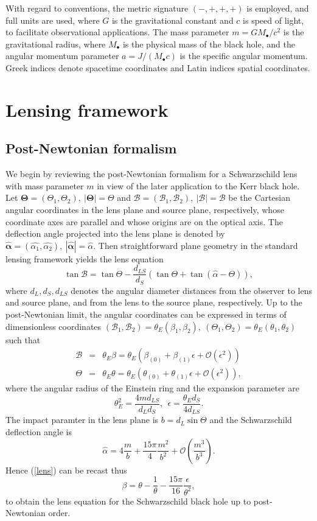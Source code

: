 \documentclass[prd,12pt,a4paper,showpacs]{revtex4}
\def\x{\theta}
\def\xo{\theta_1}
\def\xt{\theta_2}
\def\b{\mathcal{B}}
\def\bo{\b_1}
\def\bt{\b_2}
\def\t{\Theta}
\def\to{\t_1}
\def\tt{\t_2}
\def\z{\beta}
\def\zo{\z_1}
\def\zt{\z_2}
\begin{document}
With regard to conventions, the metric 
signature $(-,+,+,+)$ is employed, and full units are used, where $G$ is the gravitational constant and
$c$ is speed of light, to facilitate observational applications. 
The mass parameter $m = G M_\bullet/c^2$ is the gravitational radius, 
where $M_\bullet$ is the 
physical mass of the black hole, and the angular momentum 
parameter $a=J/(M_\bullet c)$ is the specific angular momentum.
Greek indices denote spacetime coordinates and Latin indices spatial coordinates.

\section{Lensing framework}
\subsection{Post-Newtonian formalism}
We begin by reviewing the post-Newtonian formalism for a 
Schwarzschild lens with mass parameter $m$ in view of the later application to the 
Kerr black hole. 
Let $\boldsymbol{\t}=(\to,\tt), \ |\boldsymbol{\t}|=\t$ 
and $\boldsymbol{\b}=(\bo,\bt), \ |\boldsymbol{\b}|=\b$ 
be the Cartesian angular coordinates in the lens plane and source plane, 
respectively, whose coordinate axes are parallel and whose origins are on the 
optical axis. The deflection angle projected into the lens plane is denoted by 
$\boldsymbol{\hat{\alpha}}=(\hat{\alpha_1},\hat{\alpha_2}), \ 
|\boldsymbol{\hat{\alpha}}|=\hat{\alpha}$. Then straightforward plane geometry in the standard lensing framework yields the lens equation \cite{virbhadra2}
\begin{equation}
\tan \b=\tan \t -\frac{d_{LS}}{d_S}\left(\tan \t + \tan(\hat{\alpha} -\t)\right),
\label{lens}
\end{equation}
where $d_L,d_S,d_{LS}$ denotes the 
angular diameter distances from the observer to lens and source plane, 
and from the lens to the source plane, respectively. 
Up to the post-Newtonian limit, the angular coordinates can be expressed in terms of 
dimensionless coordinates 
$(\bo,\bt)=\theta_E(\zo,\zt),\ (\to,\tt)=\theta_E(\xo,\xt)$ 
such that
\begin{eqnarray*}
\b&=&\theta_E \z=\theta_E\left(\z_{(0)}+\z_{(1)}\epsilon+\mathcal{O}(\epsilon^2)\right) \\
\t&=&\theta_E \x=\theta_E\left(\x_{(0)}+\x_{(1)}\epsilon
+\mathcal{O}(\epsilon^2)\right),
\end{eqnarray*}
where the angular radius of the Einstein ring and the expansion parameter are
\begin{equation}
\theta^2_E=\frac{4md_{LS}}{d_Ld_S}, \ \ \epsilon=\frac{\theta_Ed_S}{4d_{LS}}.
\label{parameters}
\end{equation}
The impact paramter in the lens plane is $b=d_L \sin \t$ and the Schwarzschild deflection angle is
\[
\hat{\alpha}=4\frac{m}{b}+\frac{15\pi}{4}\frac{m^2}{b^2}+\mathcal{O}\left(\frac{m^3}{b^3}\right).
\]
Hence (\ref{lens}) can be recast thus
\begin{equation}
\z=\x-\frac{1}{\x}-\frac{15\pi}{16}\frac{\epsilon}{\x^2},
\label{lens2}
\end{equation}
to obtain the lens equation for the Schwarzschild black hole up to 
post-Newtonian order.
\end{document}
